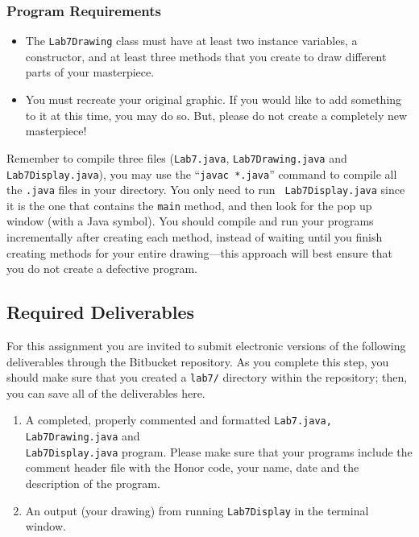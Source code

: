\subsubsection*{Program Requirements}
\vspace{-0.05in}
\begin{itemize}
\item The {\tt Lab7Drawing}  class must have at least two instance variables, a constructor, and at least three methods
  that you create to draw different parts of your masterpiece. 
\item You must recreate your original graphic. If you would like to add something to it at this time, you may do so.
  But, please do not create a completely new masterpiece!
\end{itemize}
\vspace{-0.1in}
Remember to compile three files ({\tt Lab7.java}, {\tt Lab7Drawing.java} and {\tt Lab7Display.java}), you may use the
``{\tt javac *.java}'' command to compile all the {\tt .java} files in your directory. You only need to run {\tt
Lab7Display.java} since it is the one that contains the {\tt main} method, and then look for the pop up window (with a
Java symbol). You should compile and run your programs incrementally after creating  each method, instead of waiting
until you finish creating methods for your entire drawing---this approach will best ensure that you do not create
a defective program.

\vspace{-0.2in}
\subsection*{Required Deliverables}
\vspace{-0.05in}
For this assignment you are invited to submit electronic versions of the following deliverables through the Bitbucket repository. As you complete this step, you should make sure that you
created a {\tt lab7/} directory within the repository; then, you can save all of the deliverables here. 
\vspace{-0.05in}
\begin{enumerate}
	\item A completed, properly commented and formatted {\tt Lab7.java, Lab7Drawing.java} and \\ {\tt Lab7Display.java} program. Please make sure that your programs  include the comment header file with the Honor code, your name, date and the description of the program.

        \item An output (your drawing) from running {\tt Lab7Display} in the terminal window.
\end{enumerate}
\vspace{-0.1in}

